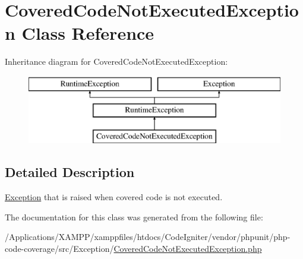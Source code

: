\hypertarget{class_sebastian_bergmann_1_1_code_coverage_1_1_covered_code_not_executed_exception}{}\section{Covered\+Code\+Not\+Executed\+Exception Class Reference}
\label{class_sebastian_bergmann_1_1_code_coverage_1_1_covered_code_not_executed_exception}
Inheritance diagram for Covered\+Code\+Not\+Executed\+Exception\+:\begin{figure}[H]
\begin{center}
\leavevmode
\includegraphics[height=3.000000cm]{class_sebastian_bergmann_1_1_code_coverage_1_1_covered_code_not_executed_exception}
\end{center}
\end{figure}


\subsection{Detailed Description}
\mbox{\hyperlink{interface_sebastian_bergmann_1_1_code_coverage_1_1_exception}{Exception}} that is raised when covered code is not executed. 

The documentation for this class was generated from the following file\+:\begin{DoxyCompactItemize}
\item 
/\+Applications/\+X\+A\+M\+P\+P/xamppfiles/htdocs/\+Code\+Igniter/vendor/phpunit/php-\/code-\/coverage/src/\+Exception/\mbox{\hyperlink{php-code-coverage_2src_2_exception_2_covered_code_not_executed_exception_8php}{Covered\+Code\+Not\+Executed\+Exception.\+php}}\end{DoxyCompactItemize}
